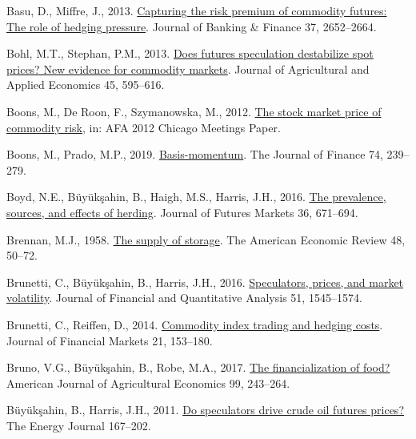 \documentclass[]{elsarticle} %
\newlength{\cslhangindent}
\newlength{\cslentryspacingunit} %
\newenvironment{CSLReferences}[2] %
 {%
  \setlength{\parindent}{0pt}
  \ifodd #1
  \let\oldpar\par
  \def\par{\hangindent=\cslhangindent\oldpar}
  \fi
  \setlength{\parskip}{#2\cslentryspacingunit}
 }%
 {}
\begin{document}
\begin{CSLReferences}{1}{0}
\leavevmode{}%
Basu, D., Miffre, J., 2013. \href{https://doi.org/10.1016/j.jbankfin.2013.02.031}{Capturing the risk premium of commodity futures: The role of hedging pressure}. Journal of Banking \& Finance 37, 2652--2664.

\leavevmode{}%
Bohl, M.T., Stephan, P.M., 2013. \href{https://doi.org/10.1017/S1074070800005150}{Does futures speculation destabilize spot prices? New evidence for commodity markets}. Journal of Agricultural and Applied Economics 45, 595--616.

\leavevmode{}%
Boons, M., De Roon, F., Szymanowska, M., 2012. \href{https://doi.org/10.2139/ssrn.1785728}{The stock market price of commodity risk}, in: AFA 2012 Chicago Meetings Paper.

\leavevmode{}%
Boons, M., Prado, M.P., 2019. \href{https://doi.org/10.1111/jofi.12738}{Basis-momentum}. The Journal of Finance 74, 239--279.

\leavevmode{}%
Boyd, N.E., Büyükşahin, B., Haigh, M.S., Harris, J.H., 2016. \href{https://doi.org/10.1002/fut.21756}{The prevalence, sources, and effects of herding}. Journal of Futures Markets 36, 671--694.

\leavevmode{}%
Brennan, M.J., 1958. \href{https://www.jstor.org/stable/1812340}{The supply of storage}. The American Economic Review 48, 50--72.

\leavevmode{}%
Brunetti, C., Büyükşahin, B., Harris, J.H., 2016. \href{https://doi.org/10.1017/S0022109016000569}{Speculators, prices, and market volatility}. Journal of Financial and Quantitative Analysis 51, 1545--1574.

\leavevmode{}%
Brunetti, C., Reiffen, D., 2014. \href{https://doi.org/10.1016/j.finmar.2014.08.001}{Commodity index trading and hedging costs}. Journal of Financial Markets 21, 153--180.

\leavevmode{}%
Bruno, V.G., Büyükşahin, B., Robe, M.A., 2017. \href{https://doi.org/10.1093/ajae/aaw059}{The financialization of food?} American Journal of Agricultural Economics 99, 243--264.

\leavevmode{}%
Büyükşahin, B., Harris, J.H., 2011. \href{https://www.jstor.org/stable/41323326}{Do speculators drive crude oil futures prices?} The Energy Journal 167--202.


\end{CSLReferences}
\end{document}
